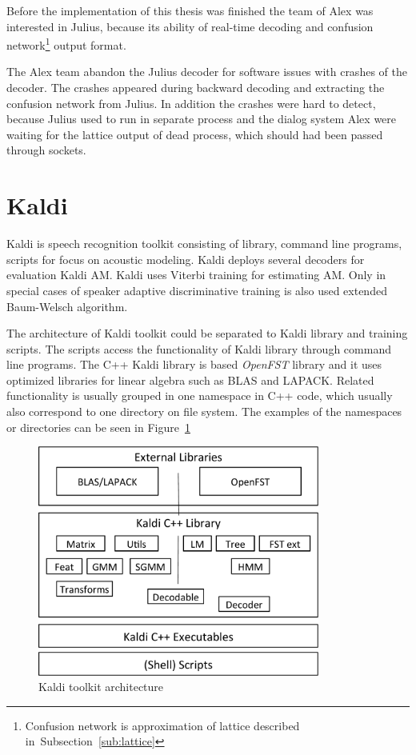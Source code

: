 Before the implementation of this thesis was finished 
the team of Alex was interested in Julius, because its ability of real-time decoding 
and confusion 
network\footnote{Confusion network is approximation of lattice described in~Subsection~\ref{sub:lattice}} 
output format.

The Alex team abandon the Julius decoder for software issues with crashes of the decoder. 
The crashes appeared during backward decoding and extracting
the confusion network from Julius. 
In addition the crashes were hard to detect,
because Julius used to run in separate process and the dialog system Alex were waiting for the lattice output of dead process,
which should had been passed through sockets.

\section{Kaldi}
\label{sec:back_kaldi}

Kaldi is speech recognition toolkit consisting of library, command line programs, scripts for focus on acoustic modeling.
Kaldi deploys several decoders for evaluation Kaldi \ac{AM}.
Kaldi uses Viterbi training for estimating \ac{AM}. 
Only in special cases of speaker adaptive discriminative training is also used extended Baum-Welsch algorithm\cite{povey2011kaldi}.

The architecture of Kaldi toolkit could be separated to Kaldi library and training scripts.
The scripts access the functionality of Kaldi library through command line programs.
The C++ Kaldi library is based {\it OpenFST}\cite{allauzen2007openfst} library and 
it uses optimized libraries for linear algebra such as BLAS and LAPACK.
Related functionality is usually grouped in one namespace in C++ code, which usually also correspond
to one directory on file system. The examples of the namespaces or directories can be seen in Figure~\ref{fig:kaldi_arch}

\begin{figure}[!htp]
    \begin{center}
        \includegraphics[width=25em]{images/kaldi-lib}
        \caption{Kaldi toolkit architecture\cite{povey2011kaldi}}
        \label{fig:kaldi_arch} 
    \end{center}
\end{figure}

